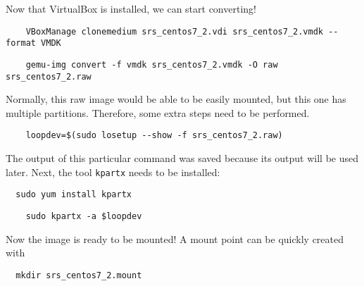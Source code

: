 \documentclass[12pt]{article}
\begin{document}
\qq Now that VirtualBox is installed, we can start converting! 

\begin{tcolorbox}[title=Convert VDI to VMDK, colback=white, colframe=black,
  coltitle=green]
  \begin{verbatim}
    VBoxManage clonemedium srs_centos7_2.vdi srs_centos7_2.vmdk --format VMDK
  \end{verbatim}
\end{tcolorbox}

\begin{tcolorbox}[title=Convert VMDK to Raw, colback=white, colframe=black,
  coltitle=green]
  \begin{verbatim}
    gemu-img convert -f vmdk srs_centos7_2.vmdk -O raw srs_centos7_2.raw
  \end{verbatim}
\end{tcolorbox}

Normally, this raw image would be able to be easily mounted, but this one has
multiple partitions. Therefore, some extra steps need to be performed.

\begin{tcolorbox}[title=Prepare Image for Mounting, colback=white,
  colframe=black, coltitle=green]
  \begin{verbatim}
    loopdev=$(sudo losetup --show -f srs_centos7_2.raw)
  \end{verbatim}
\end{tcolorbox}

The output of this particular command was saved because its output will be used
later. Next, the tool {\tt kpartx} needs to be installed:

\begin{verbatim}
  sudo yum install kpartx
\end{verbatim}

\begin{tcolorbox}[title=Map the Image's Partitions, colback=white,
  colframe=black, coltitle=green]
  \begin{verbatim}
    sudo kpartx -a $loopdev
  \end{verbatim}
\end{tcolorbox}

Now the image is ready to be mounted! A mount point can be quickly created with

\begin{verbatim}
  mkdir srs_centos7_2.mount
\end{verbatim}
\end{document}
